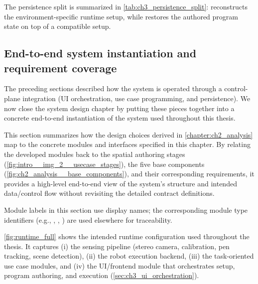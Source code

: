 The persistence split is summarized in \autoref{tab:ch3_persistence_split}:  reconstructs the environment-specific runtime setup, while  restores the authored program state on top of a compatible setup.





\subsection[End-to-end system and requirement coverage]{End-to-end system instantiation and requirement coverage}
\label{sec:ch3_demo_configuration}

The preceding sections described how the system is operated through a control-plane integration (UI orchestration, use case programming, and persistence). We now close the system design chapter by putting these pieces together into a concrete end-to-end instantiation of the system used throughout this thesis.

This section summarizes how the design choices derived in \autoref{chapter:ch2_analysis} map to the concrete modules and interfaces specified in this chapter. By relating the developed modules back to the spatial authoring stages (\autoref{fig:intro__img_2__usecase_stages}), the five base components (\autoref{fig:ch2_analysis__base_components}), and their corresponding requirements, it provides a high-level end-to-end view of the system's structure and intended data/control flow without revisiting the detailed contract definitions.

Module labels in this section use display names; the corresponding module type identifiers (e.g., , , ) are used elsewhere for traceability.

\autoref{fig:runtime_full} shows the intended runtime configuration used throughout the thesis.
It captures (i) the sensing pipeline (stereo camera, calibration, pen tracking, scene detection),
(ii) the robot execution backend, (iii) the task-oriented use case modules, and (iv) the UI/frontend module that orchestrates setup, program authoring, and execution (\autoref{sec:ch3_ui_orchestration}).

